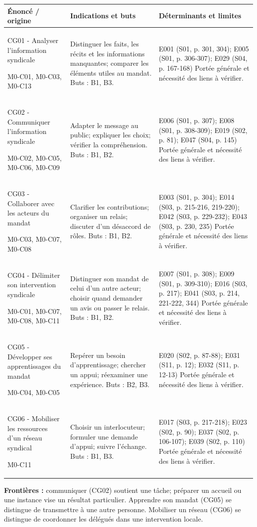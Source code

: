 \documentclass[9pt,a4paper,landscape]{extarticle}
\begin{document}
\renewcommand{\arraystretch}{1.15}\begin{longtable}{|p{55mm}|p{95mm}|p{110mm}|}\hline\rowcolor{pale}\textbf{Énoncé / origine} & \textbf{Indications et buts} & \textbf{Déterminants et limites}\\\hline\endhead
CG01 - Analyser l’information syndicale\par M0-C01, M0-C03, M0-C13 & Distinguer les faits, les récits et les informations manquantes; comparer les éléments utiles au mandat. Buts : B1, B3. & E001 (S01, p. 301, 304); E005 (S01, p. 306-307); E029 (S04, p. 167-168) Portée générale et nécessité des liens à vérifier.\\\hline
CG02 - Communiquer l’information syndicale\par M0-C02, M0-C05, M0-C06, M0-C09 & Adapter le message au public; expliquer les choix; vérifier la compréhension. Buts : B1, B2. & E006 (S01, p. 307); E008 (S01, p. 308-309); E019 (S02, p. 81); E047 (S04, p. 145) Portée générale et nécessité des liens à vérifier.\\\hline
CG03 - Collaborer avec les acteurs du mandat\par M0-C03, M0-C07, M0-C08 & Clarifier les contributions; organiser un relais; discuter d’un désaccord de rôles. Buts : B1, B2. & E003 (S01, p. 304); E014 (S03, p. 215-216, 219-220); E042 (S03, p. 229-232); E043 (S03, p. 230, 235) Portée générale et nécessité des liens à vérifier.\\\hline
CG04 - Délimiter son intervention syndicale\par M0-C01, M0-C07, M0-C08, M0-C11 & Distinguer son mandat de celui d’un autre acteur; choisir quand demander un avis ou passer le relais. Buts : B1, B2. & E007 (S01, p. 308); E009 (S01, p. 309-310); E016 (S03, p. 217); E041 (S03, p. 214, 221-222, 344) Portée générale et nécessité des liens à vérifier.\\\hline
CG05 - Développer ses apprentissages du mandat\par M0-C04, M0-C05 & Repérer un besoin d’apprentissage; chercher un appui; réexaminer une expérience. Buts : B2, B3. & E020 (S02, p. 87-88); E031 (S11, p. 12); E032 (S11, p. 12-13) Portée générale et nécessité des liens à vérifier.\\\hline
CG06 - Mobiliser les ressources d’un réseau syndical\par M0-C11 & Choisir un interlocuteur; formuler une demande d’appui; suivre l’échange. Buts : B1, B3. & E017 (S03, p. 217-218); E023 (S02, p. 90); E037 (S02, p. 106-107); E039 (S02, p. 110) Portée générale et nécessité des liens à vérifier.\\\hline
\end{longtable}\textbf{Frontières :} communiquer (CG02) soutient une tâche; préparer un accueil ou une instance vise un résultat particulier. Apprendre son mandat (CG05) se distingue de transmettre à une autre personne. Mobiliser un réseau (CG06) se distingue de coordonner les délégués dans une intervention locale.\par
\end{document}
